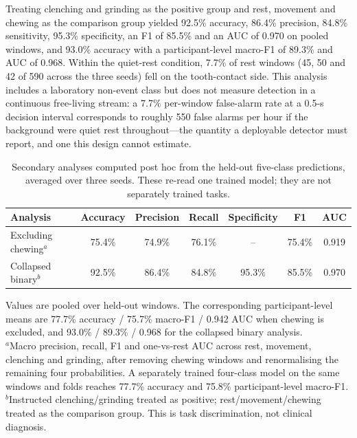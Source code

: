 \documentclass[pdflatex,sn-nature,iicol]{sn-jnl}
\begin{document}
Treating clenching and grinding as the positive group and rest, movement and chewing as the comparison group yielded 92.5\% accuracy, 86.4\% precision, 84.8\% sensitivity, 95.3\% specificity, an F1 of 85.5\% and an AUC of 0.970 on pooled windows, and 93.0\% accuracy with a participant-level macro-F1 of 89.3\% and AUC of 0.968. Within the quiet-rest condition, 7.7\% of rest windows (45, 50 and 42 of 590 across the three seeds) fell on the tooth-contact side. This analysis includes a laboratory non-event class but does not measure detection in a continuous free-living stream: a 7.7\% per-window false-alarm rate at a 0.5-s decision interval corresponds to roughly 550 false alarms per hour if the background were quiet rest throughout---the quantity a deployable detector must report, and one this design cannot estimate.

\begin{table}[t]
  \caption{Secondary analyses computed post hoc from the held-out five-class predictions, averaged over three seeds. These re-read one trained model; they are not separately trained tasks.}
  \label{tab:sensitivity}
  \centering
  \small
  \begin{tabular*}{\textwidth}{@{\extracolsep{\fill}}lcccccc@{}}
    \toprule
    Analysis & Accuracy & Precision & Recall & Specificity & F1 & AUC \\
    \midrule
    Excluding chewing$^{a}$ & 75.4\% & 74.9\% & 76.1\% & -- & 75.4\% & 0.919 \\
    Collapsed binary$^{b}$ & 92.5\% & 86.4\% & 84.8\% & 95.3\% & 85.5\% & 0.970 \\
    \bottomrule
  \end{tabular*}
  \begin{flushleft}\footnotesize
  Values are pooled over held-out windows. The corresponding participant-level means are 77.7\% accuracy / 75.7\% macro-F1 / 0.942 AUC when chewing is excluded, and 93.0\% / 89.3\% / 0.968 for the collapsed binary analysis.\\
  $^{a}$Macro precision, recall, F1 and one-vs-rest AUC across rest, movement, clenching and grinding, after removing chewing windows and renormalising the remaining four probabilities. A separately trained four-class model on the same windows and folds reaches 77.7\% accuracy and 75.8\% participant-level macro-F1.\\
  $^{b}$Instructed clenching/grinding treated as positive; rest/movement/chewing treated as the comparison group. This is task discrimination, not clinical diagnosis.
  \end{flushleft}
\end{table}
\end{document}
